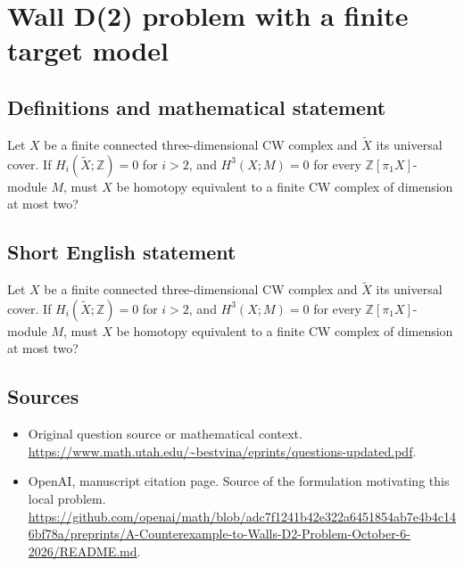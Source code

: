 \documentclass[11pt]{article}
\begin{document}
\section*{Wall D(2) problem with a finite target model}\label{30007511}
\subsection{Definitions and mathematical statement}
Let $X$ be a finite connected three-dimensional CW complex and $\widetilde X$ its universal cover. If $H_i(\widetilde X;\mathbb Z)=0$ for $i>2$, and $H^3(X;M)=0$ for every $\mathbb Z[\pi_1X]$-module $M$, must $X$ be homotopy equivalent to a finite CW complex of dimension at most two?
\subsection{Short English statement}
Let $X$ be a finite connected three-dimensional CW complex and $\widetilde X$ its universal cover. If $H_i(\widetilde X;\mathbb Z)=0$ for $i>2$, and $H^3(X;M)=0$ for every $\mathbb Z[\pi_1X]$-module $M$, must $X$ be homotopy equivalent to a finite CW complex of dimension at most two?
\subsection{Sources}
\begin{itemize}
\item[S1] Original question source or mathematical context.
\url{https://www.math.utah.edu/~bestvina/eprints/questions-updated.pdf}.
\item[S2] OpenAI, manuscript citation page. Source of the formulation motivating this local problem.
\url{https://github.com/openai/math/blob/adc7f1241b42e322a6451854ab7e4b4c146bf78a/preprints/A-Counterexample-to-Walls-D2-Problem-October-6-2026/README.md}.
\end{itemize}
\end{document}

